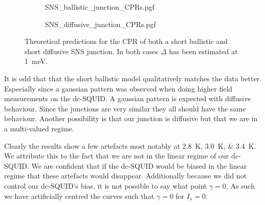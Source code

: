 \begin{figure}[ht!]
	\begin{subfigure}[t]{\textwidth}
		\centering
		{SNS_ballistic_junction_CPRs.pgf}
	\end{subfigure}
	\hfill
	\begin{subfigure}[t]{\textwidth}
		\centering
		{SNS_diffusive_junction_CPRs.pgf}
	\end{subfigure}

	\caption{Theoretical predictions for the CPR of both a short ballistic and short diffusive SNS junction. In both cases $\Delta$ has been estimated at \qty{1}{\milli\electronvolt}.}
	\label{fig:SNS_junction_predictions}
\end{figure}

It is odd that that the short ballistic model qualitatively matches the data better. Especially since a gaussian pattern was observed when doing higher field measurements on the dc-SQUID. A gaussian pattern is expected with diffusive behaviour. Since the junctions are very similar they all should have the same behaviour. Another possibility is that our junction is diffusive but that we are in a multi-valued regime.

Clearly the results show a few artefacts most notably at \qtylist{2.8;3.0;3.4}{\kelvin}. We attribute this to the fact that we are not in the linear regime of our dc-SQUID. We are confident that if the dc-SQUID would be biased in the linear regime that these artefacts would disappear. Additionally because we did not control our dc-SQUID's bias, it is not possible to say what point $\gamma = 0$. As such we have artificially centred the curves such that $\gamma = 0$ for $I_s=0$.